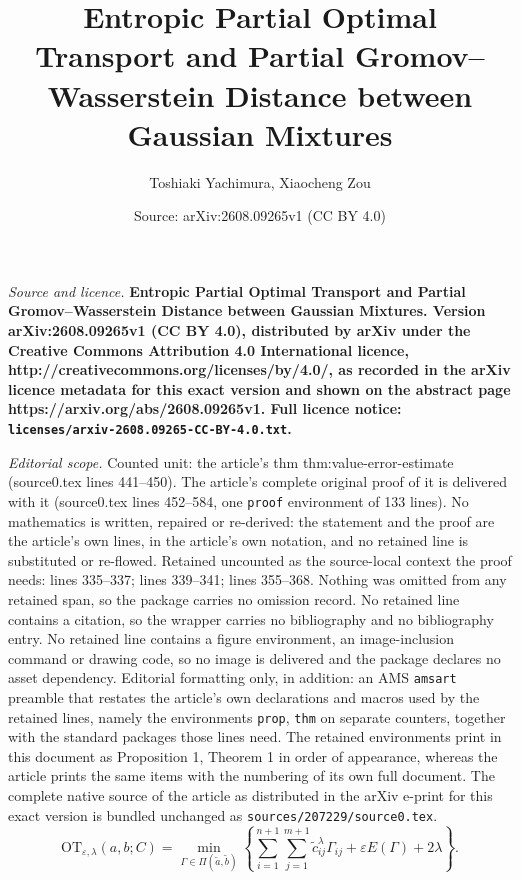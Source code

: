 \documentclass[10pt,a4paper]{amsart}
\title{\bf Entropic Partial Optimal Transport and Partial Gromov--Wasserstein Distance between Gaussian Mixtures}
\author{Toshiaki Yachimura, Xiaocheng Zou}
\date{Source: arXiv:2608.09265v1 (CC BY 4.0)}
\newcommand{\OT}{\mathrm{OT}}
\newcommand{\eps}{\varepsilon}
\begin{document}
\maketitle

\noindent\emph{Source and licence.} \bf Entropic Partial Optimal Transport and Partial Gromov--Wasserstein Distance between Gaussian Mixtures. Version arXiv:2608.09265v1 (CC BY 4.0), distributed by arXiv under the Creative Commons Attribution 4.0 International licence, http://creativecommons.org/licenses/by/4.0/, as recorded in the arXiv licence metadata for this exact version and shown on the abstract page https://arxiv.org/abs/2608.09265v1. Full licence notice: \texttt{licenses/arxiv-2608.09265-CC-BY-4.0.txt}.\par\smallskip

\noindent\textit{Editorial scope.} Counted unit: the article's thm thm:value-error-estimate (source0.tex lines 441--450). The article's complete original proof of it is delivered with it (source0.tex lines 452--584, one \texttt{proof} environment of 133 lines). No mathematics is written, repaired or re-derived: the statement and the proof are the article's own lines, in the article's own notation, and no retained line is substituted or re-flowed.  Retained uncounted as the source-local context the proof needs: lines 335--337; lines 339--341; lines 355--368.  Nothing was omitted from any retained span, so the package carries no omission record.  No retained line contains a citation, so the wrapper carries no bibliography and no bibliography entry.  No retained line contains a figure environment, an image-inclusion command or drawing code, so no image is delivered and the package declares no asset dependency.  Editorial formatting only, in addition: an AMS \texttt{amsart} preamble that restates the article's own declarations and macros used by the retained lines, namely the environments \texttt{prop}, \texttt{thm} on separate counters, together with the standard packages those lines need.  The retained environments print in this document as Proposition 1, Theorem 1 in order of appearance, whereas the article prints the same items with the numbering of its own full document.  The complete native source of the article as distributed in the arXiv e-print for this exact version is bundled unchanged as \texttt{sources/207229/source0.tex}.
\begin{equation}\label{eq:epot}
  \OT_{\eps,\lambda}(a,b;C) = \min_{\Gamma \in \Pi(\widetilde a,\widetilde b)} \left\{\sum_{i = 1}^{n + 1}\sum_{j = 1}^{m + 1}\widetilde c^{\lambda}_{ij}\Gamma_{ij} + \eps E(\Gamma) + 2\lambda\right\}.
\end{equation}
\end{document}
